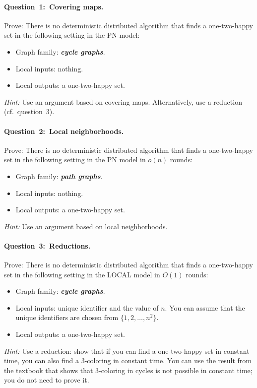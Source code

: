\documentclass[12pt,a4paper]{article}
\newcommand{\q}[2]{\paragraph{\mbox{Question #1: }#2.}}
\newcommand{\cemph}[1]{\textbf{\emph{\boldmath #1}}}
\begin{document}
\newpage

\q{1}{Covering maps}

Prove: There is no deterministic distributed algorithm that finds a one-two-happy set in the following setting in the PN model:
\begin{itemize}
    \item Graph family: \cemph{cycle graphs}.
    \item Local inputs: nothing.
    \item Local outputs: a one-two-happy set.
\end{itemize}
\emph{Hint:} Use an argument based on covering maps. Alternatively, use a reduction (cf.\ question~3).

\q{2}{Local neighborhoods}

Prove: There is no deterministic distributed algorithm that finds a one-two-happy set in the following setting in the PN model in \cemph{$o(n)$} rounds:
\begin{itemize}
    \item Graph family: \cemph{path graphs}.
    \item Local inputs: nothing.
    \item Local outputs: a one-two-happy set.
\end{itemize}
\emph{Hint:} Use an argument based on local neighborhoods.

\q{3}{Reductions}

Prove: There is no deterministic distributed algorithm that finds a one-two-happy set in the following setting in the LOCAL model in \cemph{$O(1)$} rounds:
\begin{itemize}
    \item Graph family: \cemph{cycle graphs}.
    \item Local inputs: unique identifier and the value of $n$. You can assume that the unique identifiers are chosen from $\{1,2,\dotsc,n^2\}$.
    \item Local outputs: a one-two-happy set.
\end{itemize}
\emph{Hint:} Use a reduction: show that if you can find a one-two-happy set in constant time, you can also find a $3$-coloring in constant time. You can use the result from the textbook that shows that $3$-coloring in cycles is not possible in constant time; you do not need to prove it.
\end{document}
